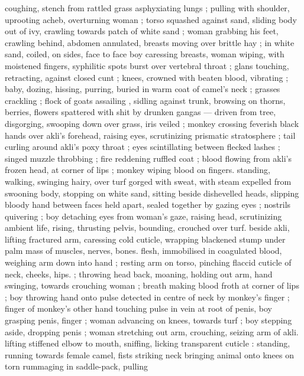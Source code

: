 coughing, stench from rattled grass asphyxiating lungs ; pulling with 
shoulder, uprooting acheb, overturning woman ; torso squashed 
against sand, sliding body out of ivy, crawling towards patch of white 
sand ; woman grabbing his feet, crawling behind, abdomen 
annulated, breasts moving over brittle hay ; in white sand, coiled, on 
sides, face to face {\col} boy caressing breasts, woman wiping, with 
moistened fingers, syphilitic spots burst over vertebral throat ; glans 
touching, retracting, against closed cunt ; knees, crowned with 
beaten blood, vibrating ; baby, dozing, hissing, purring, buried in 
warm coat of camel's neck ; grasses crackling ; flock of goats 
assailing , sidling against trunk, browsing on thorns, berries, 
flowers spattered with shit by drunken gangas --- driven from tree, 
disgorging, swooping down over grass, iris veiled ; monkey crossing 
feverish black hands over akli's forehead, raising eyes, scrutinizing 
prismatic stratosphere ; tail curling around akli's poxy throat ; eyes 
scintillating between flecked lashes ; singed muzzle throbbing ; fire 
reddening ruffled coat ; blood flowing from akli's frozen head, 
 at corner of lips ; monkey wiping blood on fingers. 
standing, walking, swinging hairy, over turf gorged with sweat, with 
steam expelled from swooning body, stopping on white sand, sitting 
beside dishevelled heads, slipping bloody hand between faces held 
apart, sealed together by gazing eyes ; nostrils quivering ; boy 
detaching eyes from woman's gaze, raising head, scrutinizing 
ambient life, rising, thrusting pelvis, bounding, crouched over turf. 
beside akli, lifting fractured arm, caressing cold cuticle, wrapping 
blackened stump under palm {\col} mass of muscles, nerves, bones. 
flesh, immobilised in coagulated blood, weighing arm down into hand 
; resting arm on torso, pinching flaccid cuticle of neck, cheeks, hips. 
 ; throwing head back, moaning, holding out arm, hand 
swinging, towards crouching woman ; breath making blood froth at 
corner of lips ; boy throwing hand onto pulse detected in centre of 
neck by monkey's finger ; finger of monkey's other hand touching 
pulse in vein at root of penis, boy grasping penis, finger ; woman 
advancing on knees, towards turf ; boy stepping aside, dropping 
penis ; woman stretching out arm, crouching, seizing arm of akli. 
lifting stiffened elbow to mouth, sniffing, licking transparent cuticle : 
standing, running towards female camel, fists striking neck bringing 
animal onto knees on torn  rummaging in saddle-pack, pulling 
